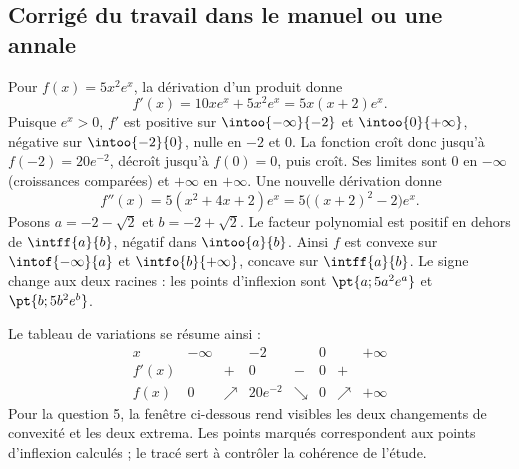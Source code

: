 \subsection{Corrigé du travail dans le manuel ou une annale}Pour $f(x)=5x^2e^x$, la dérivation d'un produit donne
\[f'(x)=10xe^x+5x^2e^x=5x(x+2)e^x.\]
Puisque $e^x>0$, $f'$ est positive sur $\intoo{-\infty}{-2}$ et $\intoo{0}{+\infty}$, négative sur $\intoo{-2}{0}$, nulle en $-2$ et $0$. La fonction croît donc jusqu'à $f(-2)=20e^{-2}$, décroît jusqu'à $f(0)=0$, puis croît. Ses limites sont $0$ en $-\infty$ (croissances comparées) et $+\infty$ en $+\infty$.
Une nouvelle dérivation donne
\[f''(x)=5(x^2+4x+2)e^x=5\bigl((x+2)^2-2\bigr)e^x.\]
Posons $a=-2-\sqrt2$ et $b=-2+\sqrt2$. Le facteur polynomial est positif en dehors de $\intff{a}{b}$, négatif dans $\intoo{a}{b}$. Ainsi $f$ est convexe sur $\intof{-\infty}{a}$ et $\intfo{b}{+\infty}$, concave sur $\intff{a}{b}$. Le signe change aux deux racines : les points d'inflexion sont $\pt{a;5a^2e^a}$ et $\pt{b;5b^2e^b}$.\par Le tableau de variations se résume ainsi :
\[\begin{array}{c|ccccccc}x&-\infty&&-2&&0&&+\infty\\\hline f'(x)&&+&0&-&0&+&\\\hline f(x)&0&\nearrow&20e^{-2}&\searrow&0&\nearrow&+\infty\end{array}\]
Pour la question 5, la fenêtre ci-dessous rend visibles les deux changements de convexité et les deux extrema. Les points marqués correspondent aux points d'inflexion calculés ; le tracé sert à contrôler la cohérence de l'étude.
\begin{center}\end{center}

\fi

